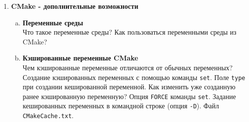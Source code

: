 \documentclass{article}
\begin{document}
\begin{enumerate}
\begin{enumerate}[a.]
\newpage
\item \textbf{Файлы}\\
Команда \texttt{file} и её опции:
\begin{multicols}{3}
\begin{itemize}
\item \texttt{READ}
\item \texttt{STRINGS}
\item \texttt{WRITE}
\item \texttt{MAKE\_DIRECTORY}
\item \texttt{REMOVE}
\item \texttt{RENAME}
\item \texttt{COPY}
\item \texttt{SIZE}
\item \texttt{CHMOD}
\item \texttt{REAL\_PATH}
\item \texttt{DOWNLOAD}
\item \texttt{GLOB}
\end{itemize}
\end{multicols}
Является ли хорошей идеей использование команды \texttt{file} с опцией \texttt{GLOB}, чтобы найти названия всех файлов исходного кода некоторого таргета?

\item \textbf{Модули}\\
Что представляет собой модуль в языке CMake. Подключение модулей. Команда \texttt{include}. В каких папках ищутся модули? Переменная \texttt{CMAKE\_MODULE\_PATH}. Область видимости переменных. Переменные \texttt{CMAKE\_CURRENT\_LIST\_DIR} и \texttt{CMAKE\_CURRENT\_LIST\_FILE}. Чем команда \texttt{include} отличается от команды \texttt{add\_subdirectory}?
Команда \texttt{include\_guard}.

\end{enumerate}






\item \textbf{CMake - дополнительные возможности}

\begin{enumerate}[a.]
\item \textbf{Переменные среды}\\
Что такое переменные среды? Как пользоваться переменными среды из CMake?

\item \textbf{Кэшированные переменные CMake}\\
Чем кэшированные переменные отличаются от обычных переменных? Создание кэшированных переменных с помощью команды \texttt{set}. Поле \texttt{type} при создании кешированной переменной. Как изменить уже созданную ранее кэшированную переменную? Опция \texttt{FORCE} команды \texttt{set}. Задание кешированных переменных в командной строке (опция \texttt{-D}). Файл \texttt{CMakeCache.txt}.


\end{enumerate}
\end{enumerate}
\end{document}

